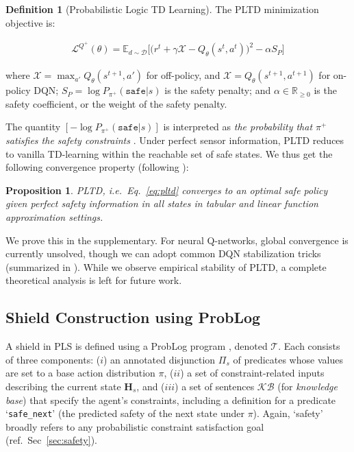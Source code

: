 \documentclass{ecai}
\theoremstyle{plain}
\newtheorem{proposition}[theorem]{Proposition}
\theoremstyle{definition}
\newtheorem{definition}[theorem]{Definition}
\theoremstyle{remark}
\begin{document}
\begin{definition}[Probabilistic Logic TD Learning] \label{def:pltd}The PLTD minimization objective is:
\begin{small}
\begin{equation}
\begin{aligned}\label{eq:pltd}
    \mathcal{L}^{Q^+}(\theta) = \mathbb{E}_{d\sim \mathcal{D}}
    \Big[ \Big( r^t + \gamma \mathcal{X}
     - Q_\theta(s^t, a^t) \Big)^2 - \alpha S_P
    \Big]
\end{aligned}
\end{equation}
\end{small}
\noindent where $\mathcal{X}=\max_{a'} Q_\theta(s^{t+1}, a')$ for off-policy, and $\mathcal{X}=Q_\theta(s^{t+1}, a^{t+1})$ for on-policy DQN; $S_P=\log P_{\pi^+}(\mathtt{safe}|s)$ is the safety penalty; and $\alpha\in\mathbb{R}_{\geq 0}$ is the safety coefficient, or the weight of the safety penalty.
\end{definition}
The quantity $[-\log P_{\pi^+}(\mathtt{safe}|s)]$ is interpreted as \textit{the probability that $\pi^+$ satisfies the safety constraints} \citep{yang2023safe}. Under perfect sensor information, PLTD reduces to vanilla TD-learning within the reachable set of safe states. We thus get the following convergence property (following \citet{tsitsiklis1996analysis}):
\begin{proposition}\label{prop:pltdconvergence}
    PLTD, i.e.\ Eq.~\ref{eq:pltd} converges to an optimal safe policy given perfect safety information in all states in tabular and linear function approximation settings.
\end{proposition}
We prove this in the supplementary. For neural Q-networks, global convergence is currently unsolved, though we can adopt common DQN stabilization tricks (summarized in \citep{hessel2018rainbow}). While we observe empirical stability of PLTD, a complete theoretical analysis is left for future work.
\vspace{-0.5\baselineskip}
\subsection{Shield Construction using ProbLog}\label{sec:shield_creation}
A shield in PLS is defined using a ProbLog program \citep{de2007problog}, denoted $\mathcal{T}$. Each consists of three components: ($i$) an annotated disjunction $\Pi_s$ of predicates whose values are set to a base action distribution $\pi$, ($ii$) a set of constraint-related inputs describing the current state $\mathbf{H}_s$, and ($iii$) a set of sentences $\mathcal{KB}$ (for \emph{knowledge base}) that specify the agent's constraints, including a definition for a predicate `\texttt{safe\_next}' (the predicted safety of the next state under $\pi$). Again, `safety' broadly refers to any probabilistic constraint satisfaction goal (ref.\ Sec~\ref{sec:safety}).
\end{document}

